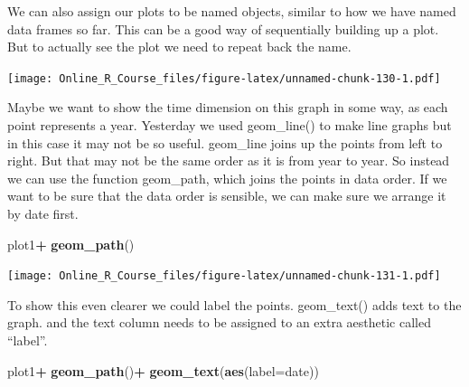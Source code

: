 \documentclass[]{book}
\newenvironment{Shaded}{\begin{snugshade}}{\end{snugshade}}
\newcommand{\DataTypeTok}[1]{\textcolor[rgb]{0.13,0.29,0.53}{#1}}
\newcommand{\KeywordTok}[1]{\textcolor[rgb]{0.13,0.29,0.53}{\textbf{#1}}}
\newcommand{\NormalTok}[1]{#1}
\newcommand{\OperatorTok}[1]{\textcolor[rgb]{0.81,0.36,0.00}{\textbf{#1}}}
\newcommand{\StringTok}[1]{\textcolor[rgb]{0.31,0.60,0.02}{#1}}
\begin{document}
We can also assign our plots to be named objects, similar to how we have named data frames so far. This can be a good way of sequentially building up a plot. But to actually see the plot we need to repeat back the name.

\begin{Shaded}
\end{Shaded}

\texttt{[image: Online\_R\_Course\_files/figure-latex/unnamed-chunk-130-1.pdf]}

Maybe we want to show the time dimension on this graph in some way, as each point represents a year. Yesterday we used geom\_line() to make line graphs but in this case it may not be so useful. geom\_line joins up the points from left to right. But that may not be the same order as it is from year to year. So instead we can use the function geom\_path, which joins the points in data order. If we want to be sure that the data order is sensible, we can make sure we arrange it by date first.

\begin{Shaded}
\begin{Highlighting}[]
\NormalTok{plot1}\OperatorTok{+}
\StringTok{  }\KeywordTok{geom_path}\NormalTok{()}
\end{Highlighting}
\end{Shaded}

\texttt{[image: Online\_R\_Course\_files/figure-latex/unnamed-chunk-131-1.pdf]}

To show this even clearer we could label the points. geom\_text() adds text to the graph. and the text column needs to be assigned to an extra aesthetic called ``label''.

\begin{Shaded}
\begin{Highlighting}[]
\NormalTok{plot1}\OperatorTok{+}
\StringTok{  }\KeywordTok{geom_path}\NormalTok{()}\OperatorTok{+}
\StringTok{    }\KeywordTok{geom_text}\NormalTok{(}\KeywordTok{aes}\NormalTok{(}\DataTypeTok{label=}\NormalTok{date))}
\end{Highlighting}
\end{Shaded}
\end{document}
